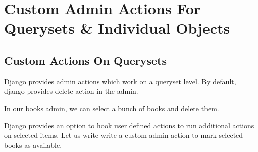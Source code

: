 \documentclass[letterpaper,11pt,english]{sphinxmanual}
\begin{document}
\chapter{Custom Admin Actions For Querysets \& Individual Objects}
\label{\detokenize{admin_custom_admin_actions:custom-admin-actions-for-querysets-individual-objects}}\label{\detokenize{admin_custom_admin_actions::doc}}

\section{Custom Actions On Querysets}
\label{\detokenize{admin_custom_admin_actions:custom-actions-on-querysets}}
Django provides admin actions which work on a queryset level. By default, django provides delete action in the admin.

In our books admin, we can select a bunch of books and delete them.


Django provides an option to hook user defined actions to run additional actions on selected items. Let us write write a custom admin action to mark selected books as available.

\begin{sphinxVerbatim}[commandchars=\\\{\}]
   
  


 
      
        
\end{sphinxVerbatim}
\end{document}
